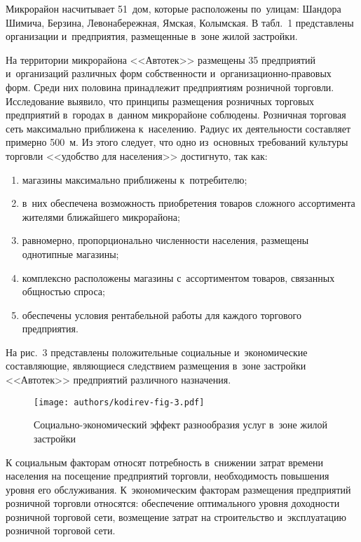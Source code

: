 

Микрорайон насчитывает 51~дом, которые расположены по~улицам: Шандора Шимича, Берзина, Левонабережная, Ямская, Колымская. В табл.~1 представлены организации и~предприятия, размещенные в~зоне жилой застройки.



На территории микрорайона <<Автотек>> размещены 35 предприятий и~организаций различных форм собственности и~организационно-правовых форм. Среди них половина принадлежит предприятиям розничной торговли. Исследование выявило, что принципы размещения розничных торговых предприятий в~городах в~данном микрорайоне соблюдены. Розничная торговая сеть максимально приближена к~населению. Радиус их деятельности составляет примерно 500~м. Из этого следует, что одно из~основных требований культуры торговли <<удобство для населения>> достигнуто, так как:
\begin{enumerate}[noitemsep]\vspace{-8pt}
  \item магазины максимально приближены к~потребителю;
  \item в~них обеспечена возможность приобретения товаров сложного ассортимента жителями ближайшего микрорайона;
  \item равномерно, пропорционально численности населения, размещены однотипные магазины;
  \item комплексно расположены магазины с~ассортиментом товаров, связанных общностью спроса;
  \item обеспечены условия рентабельной работы для каждого торгового предприятия.
\end{enumerate}
 \vspace{-8pt}

На рис.~3 представлены положительные социальные и~экономические составляющие, являющиеся следствием размещения в~зоне застройки <<Автотек>> предприятий различного назначения.

\begin{figure}[H]
  \centering
  \texttt{[image: authors/kodirev-fig-3.pdf]}
  \caption{Социально-экономический эффект разнообразия услуг в~зоне жилой застройки}
  \label{fig:kodirev-fig-3}
\end{figure}

К социальным факторам относят потребность в~снижении затрат времени населения на посещение предприятий торговли, необходимость повышения уровня его обслуживания. К~экономическим факторам размещения предприятий розничной торговли относятся: обеспечение оптимального уровня доходности розничной торговой сети, возмещение затрат на строительство и~эксплуатацию розничной торговой сети.

